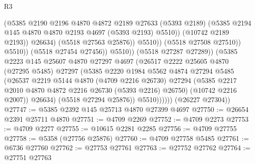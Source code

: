 \begin{lexlean}{R3}
\begin{coremodule}
                                        (@5385
                                          @2190
                                          @2196
                                          @4870
                                          @4872
                                          @2189
                                          @27633
                                          (@5393 @2189)
                                          (@5385
                                            @2194
                                            @145
                                            @4870
                                            @4870
                                            @2193
                                            @4697
                                            (@5393 @2193)
                                            @5510))
                                        (@10742 @2189 @2193))
                                      @26634)
                                    (@5518 @27563 @25876))
                                  @5510))
                              (@5518 @27508 @27510))
                            @5510))
                        (@5518 @27454 @27456))
                      @5510))
                  (@5518 @27287 @27289))
                (@5385
                  @2223
                  @145
                  @25607
                  @4870
                  @27297
                  @4697
                  (@26517
                    @2222
                    @25605
                    @4870
                    (@27295 @5485)
                    @27297
                    (@5385
                      @2220
                      @1984
                      @5562
                      @4874
                      @27294
                      @5485
                      (@26537
                        @2219
                        @5144
                        @4870
                        (@4709 @2216 @26730)
                        @27294
                        (@5385 @2217 @2010 @4870 @4872 @2216 @26730 (@5393 @2216) @26750)
                        (@10742 @2216 @2007))
                      @26634)
                    (@5518 @27294 @25876))
                  @5510))))))
      (@26227 @27304))
@27747 := @5385 @2392 @145 @25713 @4870 @27399 @4697
@27750 := @26654 @2391 @25711 @4870
@27751 := @4709 @2269
@27752 := @4709 @2273
@27753 := @4709 @2277
@27755 := @10615 @2281 @2285
@27756 := @4709 @27755
@27758 := @5358 (@27756 @25876)
@27760 := @4709 @27758 @5485
@27761 := @6736 @27760
@27762 := @27753 @27761
@27763 := @27752 @27762
@27764 := @27751 @27763

\end{coremodule}
\end{lexlean}
